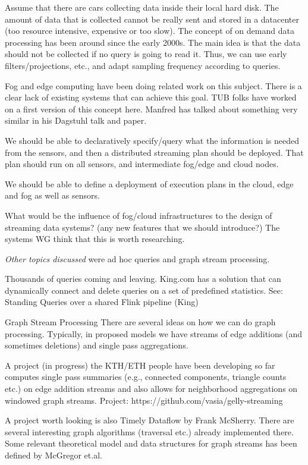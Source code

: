 Assume that there are cars collecting data inside their local hard disk. The amount of data that is collected cannot be really sent and stored in a datacenter (too resource intensive, expensive or too slow). The concept of on demand data processing has been around since the early 2000s. The main idea is that the data should not be collected if no query is going to read it. Thus, we can use early filters/projections, etc., and adapt sampling frequency according to queries. 

Fog and edge computing have been doing related work on this subject. There is a clear lack of existing systems that can achieve this goal. TUB folks have worked on a first version of this concept here. Manfred has talked about something very similar in his Dagstuhl talk and paper. 

We should be able to declaratively specify/query what the information is needed from the sensors, and then a distributed streaming plan should be deployed. That plan should run on all sensors, and intermediate fog/edge and cloud nodes.

We should be able to define a deployment of execution plans in the cloud, edge and fog as well as sensors. 

What would be the influence of fog/cloud infrastructures to the design of streaming data systems? (any new features that we should introduce?)
The systems WG think that this is worth researching.


\emph{Other topics discussed} were ad hoc queries and graph stream processing.

Thousands of queries coming and leaving. King.com has a solution that can dynamically connect and delete queries on a set of predefined statistics. See:  Standing Queries over a shared Flink pipeline (King) 


Graph Stream Processing
There are several ideas on how we can do graph processing. Typically, in proposed models we have streams of edge additions (and sometimes deletions) and single pass aggregations.

A project (in progress) the KTH/ETH people have been developing so far computes single pass summaries (e.g., connected components, triangle counts etc.) on edge addition streams and also allows for neighborhood aggregations on windowed graph streams.
Project: https://github.com/vasia/gelly-streaming

A project worth looking is also Timely Dataflow by Frank McSherry. There are several interesting graph algorithms (traversal etc.) already implemented there.
Some relevant theoretical model and data structures for graph streams has been defined by McGregor et.al.

